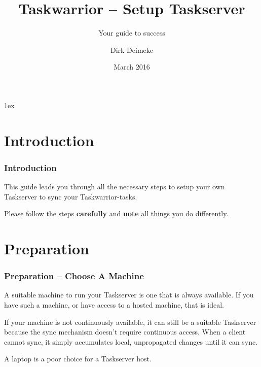 \documentclass[t,handout]{beamer}
\title{Taskwarrior -- Setup Taskserver}
\subtitle{Your guide to success}
\author[Deimeke, Dirk]{Dirk Deimeke}
\institute[Taskwarrior Academy]{Taskwarrior Academy}
\date{March 2016}
\begin{document}



\parskip1ex

\section{Introduction}

\begin{frame}[fragile]\frametitle{Introduction}
    \vfill
    This guide leads you through all the necessary steps to setup your own Taskserver to sync your Taskwarrior-tasks.

    Please follow the steps \textbf{carefully} and \textbf{note} all things you do differently.
    \vfill
\end{frame}

\section{Preparation}


\begin{frame}[fragile]\frametitle{Preparation -- Choose A  Machine}
    \vfill
	A suitable machine to run your Taskserver is one that is always available. If you have such a machine, or have access to a hosted machine, that is ideal.

	If your machine is not continuously available, it can still be a suitable Taskserver because the sync mechanism doesn't require continuous access. When a client cannot sync, it simply accumulates local, unpropagated changes until it can sync.

	A laptop is a poor choice for a Taskserver host.
\end{frame}
\end{document}
